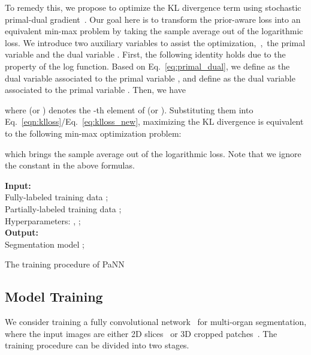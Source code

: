 \documentclass[10pt,twocolumn,letterpaper]{article}
\renewcommand{\KwResult}{\textbf{Output:}}
\renewcommand{\KwData}{\textbf{Input:}}
\begin{document}
To remedy this, we propose to optimize the KL divergence term using stochastic primal-dual gradient~\cite{liu2017unsupervised}. Our goal here is to transform the prior-aware loss into an equivalent min-max problem by taking the sample average out of the logarithmic loss. 
We introduce two auxiliary variables to assist the optimization,~\ie,~the primal variable  and the dual variable . First, the following identity holds 
 due to the property of the log function. Based on Eq.~\eqref{eq:primal_dual}, we define  as the dual variable associated to the primal variable , and define  as the dual variable associated to the primal variable . Then, we have

where  (or ) denotes the -th element of  (or ). Substituting them into Eq.~\eqref{eqn:klloss}/Eq.~\eqref{eq:klloss_new}, maximizing the KL divergence is equivalent to the following min-max optimization problem:



which brings the sample average out of the logarithmic loss. Note that we ignore the constant in the above formulas.

\begin{algorithm}[t!]\small
\DontPrintSemicolon
\KwData{\\Fully-labeled training data ;
\\Partially-labeled training data ;
\\ Hyperparameters: , ;
\\}
\KwResult{\\Segmentation model ;
\\ }
\KwRet{}
\caption{\small The training procedure of PaNN}
\label{Algo:minmax}
\end{algorithm}



\subsection{Model Training}
\label{sec:model_training}
We consider training a fully convolutional network~\cite{long2014fully, chen2018deeplab, ronneberger2015u} for multi-organ segmentation, where the input images are either 2D slices~\cite{wang2018training, roth2018spatial,zhou2017fixed} or 3D cropped patches~\cite{cciccek20163d, milletari2016v}. The training procedure can be divided into two stages.
\end{document}
